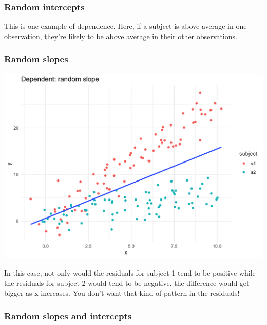 \documentclass[
  openany]{book}
\begin{document}
\hypertarget{random-intercepts}{%
\subsubsection{Random intercepts}\label{random-intercepts}}

This is one example of dependence. Here, if a subject is above average in one observation, they're likely to be above average in their other observations.

\hypertarget{random-slopes}{%
\subsubsection{Random slopes}\label{random-slopes}}

\begin{center}\includegraphics[width=1\linewidth]{images/m3/rand_slope} \end{center}

In this case, not only would the residuals for subject 1 tend to be positive while the residuals for subject 2 would tend to be negative, the difference would get bigger as x increases. You don't want that kind of pattern in the residuals!

\hypertarget{random-slopes-and-intercepts}{%
\subsubsection{Random slopes and intercepts}\label{random-slopes-and-intercepts}}
\end{document}
